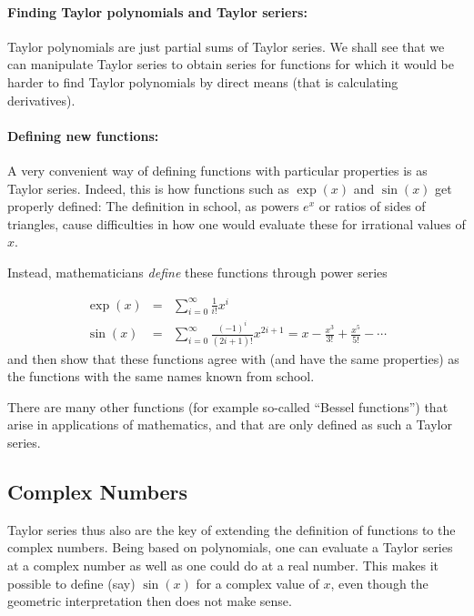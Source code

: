 \paragraph{Finding Taylor polynomials and Taylor seriers:} Taylor polynomials are just partial
sums of Taylor series. We shall see that we can manipulate Taylor series to
obtain series for functions for which it would be harder to find Taylor
polynomials by direct means (that is calculating derivatives).

\paragraph{Defining new functions:} A very convenient way of defining
functions with particular properties is as Taylor series. Indeed, this is
how functions such as $\exp(x)$ and $\sin(x)$ get properly defined: The
definition in school, as powers $e^x$ or ratios of sides of triangles, cause
difficulties
in how one would evaluate these for irrational values of $x$.

Instead, mathematicians {\em define} these functions through power series

\begin{eqnarray*}
\exp(x)&=&\sum_{i=0}^\infty\frac{1}{i!} x^i\\
\sin(x)&=&\sum_{i=0}^\infty
\frac{(-1)^i}{(2i+1)!}x^{2i+1}=x-\frac{x^3}{3!}+\frac{x^5}{5!}-\cdots
\end{eqnarray*}
and then show that these functions agree with (and have the same properties)
as the functions with the same names known from school.
\smallskip

There are many other functions (for example so-called ``Bessel functions'')
that arise in applications of mathematics, and that are only defined as such
a Taylor series.

\subsection{Complex Numbers}

Taylor series thus also are the key of extending the definition of functions to
the complex numbers. Being based on polynomials, one can evaluate a Taylor
series at a complex number as well as one could do at a real number. This
makes it possible to define (say) $\sin(x)$ for a complex value of $x$, even
though the geometric interpretation then does not make sense.

